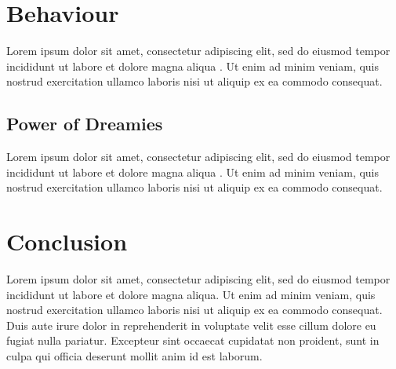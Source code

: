 \documentclass{article}
\begin{document}
\section{Behaviour}

Lorem ipsum dolor sit amet, consectetur adipiscing elit, sed do eiusmod tempor incididunt ut labore et dolore magna aliqua \autocite{owen_are_2021}. Ut enim ad minim veniam, quis nostrud exercitation ullamco laboris nisi ut aliquip ex ea commodo consequat. 

\subsection{Power of Dreamies}

Lorem ipsum dolor sit amet, consectetur adipiscing elit, sed do eiusmod tempor incididunt ut labore et dolore magna aliqua \autocite[1443]{hetherington_two-_1975}. Ut enim ad minim veniam, quis nostrud exercitation ullamco laboris nisi ut aliquip ex ea commodo consequat. 

\section{Conclusion}

Lorem ipsum dolor sit amet, consectetur adipiscing elit, sed do eiusmod tempor incididunt ut labore et dolore magna aliqua. Ut enim ad minim veniam, quis nostrud exercitation ullamco laboris nisi ut aliquip ex ea commodo consequat. Duis aute irure dolor in reprehenderit in voluptate velit esse cillum dolore eu fugiat nulla pariatur. Excepteur sint occaecat cupidatat non proident, sunt in culpa qui officia deserunt mollit anim id est laborum.

\printbibliography
\end{document}
